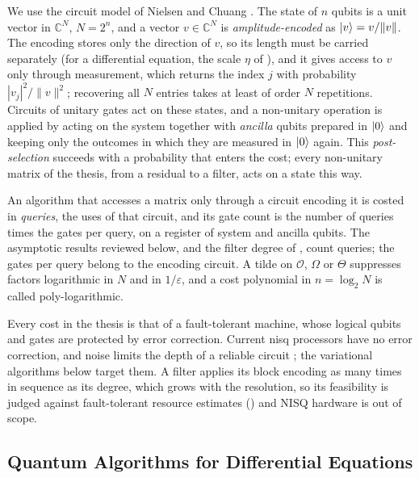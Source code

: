 We use the circuit model of Nielsen and Chuang \cite{nielsenchuang2010}. The state of $n$ qubits is a unit vector in $\mathbb{C}^N$, $N=2^n$, and a vector $v\in\mathbb{C}^N$ is \emph{amplitude-encoded} as $\ket{v}=v/\|v\|$. The encoding stores only the direction of $v$, so its length must be carried separately (for a differential equation, the scale $\eta$ of ), and it gives access to $v$ only through measurement, which returns the index $j$ with probability $|v_j|^2/\|v\|^2$; recovering all $N$ entries takes at least of order $N$ repetitions. Circuits of unitary gates act on these states, and a non-unitary operation is applied by acting on the system together with \emph{ancilla} qubits prepared in $\ket{0}$ and keeping only the outcomes in which they are measured in $\ket{0}$ again. This \emph{post-selection} succeeds with a probability that enters the cost; every non-unitary matrix of the thesis, from a residual to a filter, acts on a state this way.

An algorithm that accesses a matrix only through a circuit encoding it is costed in \emph{queries}, the uses of that circuit, and its gate count is the number of queries times the gates per query, on a register of system and ancilla qubits. The asymptotic results reviewed below, and the filter degree of , count queries; the gates per query belong to the encoding circuit. A tilde on $\mathcal O$, $\Omega$ or $\Theta$ suppresses factors logarithmic in $N$ and in $1/\varepsilon$, and a cost polynomial in $n=\log_2N$ is called poly-logarithmic.

Every cost in the thesis is that of a fault-tolerant machine, whose logical qubits and gates are protected by error correction. Current \gls{nisq} processors have no error correction, and noise limits the depth of a reliable circuit \cite{preskill2018nisq}; the variational algorithms below target them. A filter applies its block encoding as many times in sequence as its degree, which grows with the resolution, so its feasibility is judged against fault-tolerant resource estimates () and NISQ hardware is out of scope.

\subsection{Quantum Algorithms for Differential Equations}
\label{sec:bg-de}

